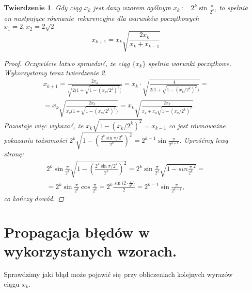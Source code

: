 \documentclass[10pt,wide]{mwart}
\newtheorem{tw}{Twierdzenie}
\theoremstyle{definition}
\begin{document}
 \begin{tw}
  Gdy ciąg \(x_k\) jest dany wzorem ogólnym \( x_k := 2^{k}\sin\frac{\pi}{2^k} \), to spełnia on nastpujące równanie rekurencyjne dla warunków początkowych \( x_1 = 2, x_2 = 2\sqrt{2}\)
  \begin{equation}
  x_{k+1} = x_k \sqrt{\frac{2x_k}{x_k + x_{k-1}}}
\end{equation}
  \begin{proof}
    Oczywiście łatwo sprawdzić, że ciąg \(\{x_k\}\) spełnia warunki początkowe.
    Wykorzystamy teraz twierdzenie 2.
    \begin{equation*}
    \begin{split}
      x_{k+1} = \frac{2x_k}{\sqrt{2\big(1 + \sqrt{1 - (x_k/2^k)^2}\big)}} = x_{k} \cdot \sqrt{\frac{4}{2\big(1 + \sqrt{1 - (x_k/2^k)^2}\big)}} = \\
      = x_{k}\sqrt{\frac{2x_k}{x_k\big(1 + \sqrt{1 - (x_k/2^k)^2}\big)}} = x_{k}\sqrt{\frac{2x_k}{x_k + x_k\sqrt{1 - (x_k/2^k)^2}}}.
    \end{split}
    \end{equation*}
    Pozostaje więc wykazać, że \(x_k\sqrt{1 - (x_k/2^k)^2} = x_{k-1}\) co jest równoważne pokazaniu tożsamości \(2^{k}\sqrt{1 - (\frac{2^{k}\sin{\pi/2^k}}{2^k})^2} = 2^{k-1}\sin{\frac{\pi}{2^{k-1}}}\). Uprośćmy lewą stronę:
    \begin{equation*}
    \begin{split}
      2^{k}\sin\frac{\pi}{2^k}\sqrt{1 - (\frac{2^{k}\sin{\pi/2^k}}{2^k})^2} = 2^{k}\sin\frac{\pi}{2^k}\sqrt{1 - sin{\frac{\pi}{2^k}}^2} = \\
      = 2^{k}\sin\frac{\pi}{2^k}\cos\frac{\pi}{2^k} = 2^k\frac{\sin{(2 \cdot \frac{\pi}{2^k}})}{2} = 2^{k-1}\sin{\frac{\pi}{2^{k-1}}},
    \end{split}
    \end{equation*}
    co kończy dowód.
  \end{proof}
\end{tw}

\section{Propagacja błędów w wykorzystanych wzorach.}
Sprawdzimy jaki błąd może pojawić się przy obliczeniach kolejnych wyrazów ciągu \(x_k\).
\end{document}
